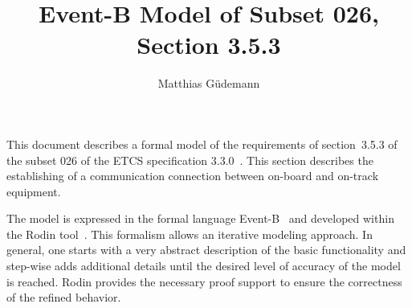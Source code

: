 \documentclass{template/openetcs_article}
\begin{document}
\frontmatter
{}





\newcommand{\true}{\ensuremath{true}}
\newcommand{\btext}[1]{{\it #1}}
\newcommand{\bvar}[1]{\btext{#1}}
\newcommand{\bevent}[1]{\btext{#1}}
\newcommand{\binv}[1]{\btext{#1}}
\newcommand{\bconst}[1]{\btext{#1}}
\newcommand{\bparam}[1]{\btext{#1}}
\newcommand{\bfunc}[1]{\btext{#1}}
\newcommand{\baxiom}[1]{\btext{#1}}
\newcommand{\btype}[1]{\btext{#1}}
\newcommand{\bguard}[1]{\btext{#1}}
\newcommand{\bmachine}[1]{\btext{#1}}
\newcommand{\bctx}[1]{\btext{#1}}

\author{Matthias Güdemann}


\title{Event-B Model of Subset 026, Section 3.5.3}




\maketitle
\tableofcontents
\listoffiguresandtables
\newpage

This document describes a formal model of the requirements of section~3.5.3 of
the subset 026 of the ETCS specification 3.3.0~\cite{SRS-026-330}. This section
describes the establishing of a communication connection between on-board and
on-track equipment.

The model is expressed in the formal language Event-B~\cite{abrial-eventB-Book}
and developed within the Rodin tool~\cite{rodin-handbook}. This formalism allows
an iterative modeling approach. In general, one starts with a very abstract
description of the basic functionality and step-wise adds additional details
until the desired level of accuracy of the model is reached. Rodin provides the
necessary proof support to ensure the correctness of the refined behavior.
\end{document}
